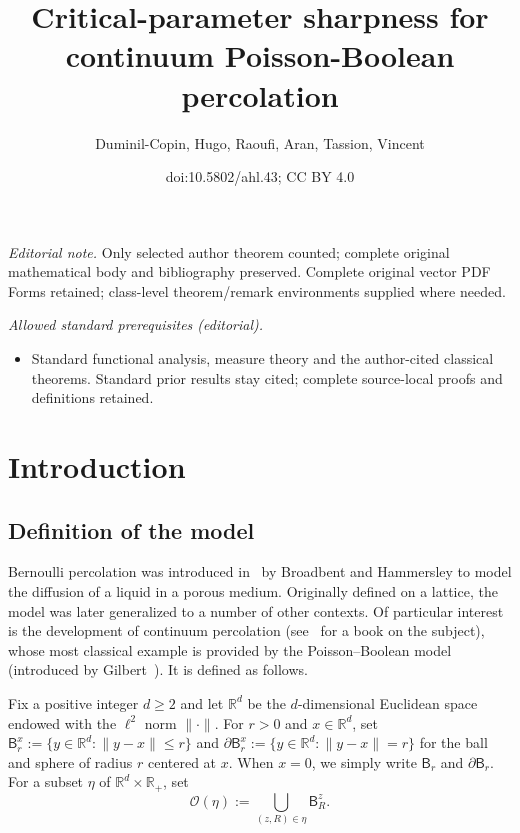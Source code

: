 \documentclass[10pt]{amsart}
\title{Critical-parameter sharpness for continuum Poisson-Boolean percolation}
\author{Duminil-Copin, Hugo, Raoufi, Aran, Tassion, Vincent}
\date{doi:10.5802/ahl.43; CC BY 4.0}
\theoremstyle{definition}\newtheorem{defi}[theo]{Definition}\newtheorem{rema}[theo]{Remark}\newtheorem{exam}[theo]{Example}\newtheorem{exem}[theo]{Example}\newtheorem{nota}[theo]{Notation}
\begin{document}
\maketitle
\noindent\textit{Editorial note.} Only selected author theorem counted; complete original mathematical body and bibliography preserved. Complete original vector PDF Forms retained; class-level theorem/remark environments supplied where needed.\par\medskip
\noindent\textit{Allowed standard prerequisites (editorial).}\begin{itemize}
\item Standard functional analysis, measure theory and the author-cited classical theorems. Standard prior results stay cited; complete source-local proofs and definitions retained.
\end{itemize}\medskip



\section{Introduction}

\subsection{Definition of the model}
Bernoulli percolation was introduced in~\cite{BroHam57} by Broadbent and Hammersley to model the diffusion of a liquid in a porous medium. Originally defined on a lattice, the model was later generalized to a number of other contexts. Of particular interest is the development of continuum percolation (see~\cite{MeeRoy08} for a book on the subject), whose most classical example is provided by the Poisson--Boolean model (introduced by Gilbert~\cite{Gil}). It is defined as follows.

Fix a positive integer $d\ge2$ and let ${\mathbb R}^d$ be the $d$-dimensional Euclidean space endowed with the $\ell^2$ norm $\|\cdot\|$. For $r>0$ and $x\in{\mathbb R}^d$, set $\mathsf B_r^x:=\{y\in{\mathbb R}^d:\|y-x\|\le r\}$ and $\partial\mathsf B_r^x:=\{y\in {\mathbb R}^d:\|y-x\|=r\}$ for the ball and sphere of radius $r$ centered at $x$. When $x=0$, we simply write $\mathsf B_r$ and $\partial\mathsf B_r$. For a subset $\eta$ of ${\mathbb R}^d\times{\mathbb R}_+$, set
\[
{\mathcal O}(\eta):=\bigcup_{(z,R)\in\eta} \mathsf B_R^z.
\]
\end{document}
